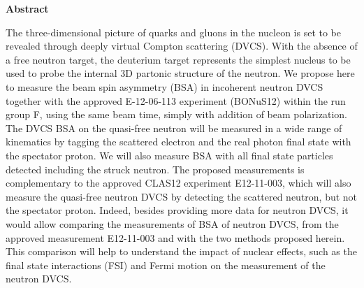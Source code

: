 \setcounter{page}{5}

     \begin{center}
{\large\textbf{Abstract}}
    \end{center}
\vspace*{0.4cm}

The three-dimensional picture of quarks and gluons in the nucleon is set to be 
revealed through deeply virtual Compton scattering (DVCS). With the absence of 
a free neutron target, the deuterium target represents the simplest nucleus to 
be used to probe the internal 3D partonic structure of the neutron.  We propose 
here to measure the beam spin asymmetry (BSA) in incoherent neutron DVCS 
together with the approved E-12-06-113 experiment (BONuS12) within the run 
group F, using the same beam time, simply with addition of beam polarization.  
The DVCS BSA on the quasi-free neutron will be measured in a wide range of 
kinematics by tagging the scattered electron and the real photon final state 
with the spectator proton. We will also measure BSA with all final state 
particles detected including the struck neutron. The proposed measurements is 
complementary to the approved CLAS12 experiment E12-11-003, which will also 
measure the quasi-free neutron DVCS by detecting the scattered neutron, but not 
the spectator proton.  Indeed, besides providing more data for neutron DVCS, it 
would allow comparing the measurements of BSA of neutron DVCS, from the 
approved measurement E12-11-003 and with the two methods proposed herein. This 
comparison will help to understand the impact of nuclear effects, such as the 
final state interactions (FSI) and Fermi motion on the measurement of the 
neutron DVCS.

\newpage

